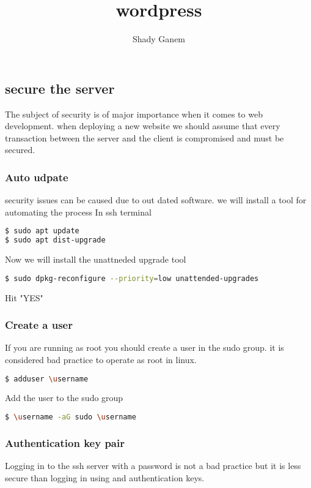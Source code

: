 \documentclass{book}
\title{wordpress}
\author{Shady Ganem}
\begin{document}
\maketitle
{
\hypersetup{linkcolor=black}
\tableofcontents
}
\part{}
\chapter{secure the server}
The subject of security is of major importance when it comes to web development.
when deploying a new website we should assume that every transaction between the 
server and the client is compromised and must be secured. 

\section{Auto udpate}
security issues can be caused due to out dated software. we will install a tool for 
automating the process
In ssh terminal
\begin{lstlisting}[language=bash]
$ sudo apt update
$ sudo apt dist-upgrade
\end{lstlisting}
Now we will install the unattneded upgrade tool
\begin{lstlisting}[language=bash]
$ sudo dpkg-reconfigure --priority=low unattended-upgrades
\end{lstlisting}
Hit "YES"

\section{Create a user}
If you are running as root you should create a user in the sudo group.
it is considered bad practice to operate as root in linux. 

\begin{lstlisting}[language=bash]
$ adduser \username
\end{lstlisting}
Add the user to the sudo group
\begin{lstlisting}[language=bash]
$ \username -aG sudo \username
\end{lstlisting}

\section{Authentication key pair}
Logging in to the ssh server with a password is not a bad practice but it is less
secure than logging in using and authentication keys.
\end{document}
